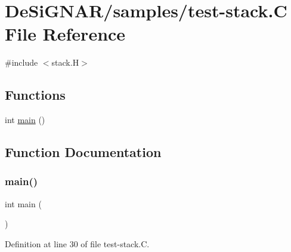 \hypertarget{test-stack_8_c}{}\section{De\+Si\+G\+N\+A\+R/samples/test-\/stack.C File Reference}
\label{test-stack_8_c}
{\ttfamily \#include $<$stack.\+H$>$}\newline
\subsection*{Functions}
\begin{DoxyCompactItemize}
\item 
int \hyperlink{test-stack_8_c_ae66f6b31b5ad750f1fe042a706a4e3d4}{main} ()
\end{DoxyCompactItemize}


\subsection{Function Documentation}
\mbox{\label{test-stack_8_c_ae66f6b31b5ad750f1fe042a706a4e3d4}} 
\subsubsection{\texorpdfstring{main()}{main()}}
{\footnotesize\ttfamily int main (\begin{DoxyParamCaption}{ }\end{DoxyParamCaption})}



Definition at line 30 of file test-\/stack.\+C.

